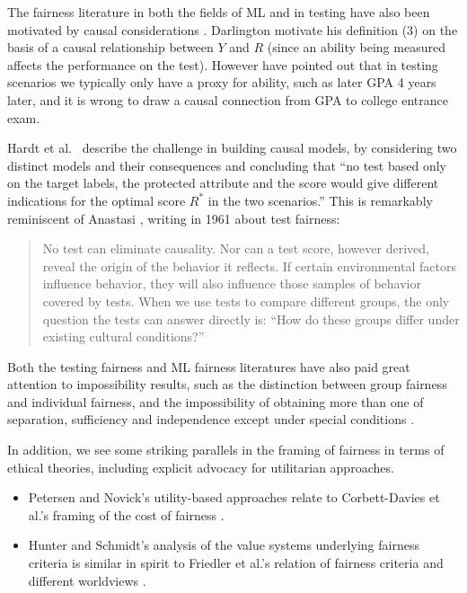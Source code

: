 \documentclass[sigconf,letterpaper,9pt]{acmart}
\begin{document}
The fairness literature in both the fields of ML and in testing have also been motivated by causal
considerations \cite{kusner2017counterfactual, Hardtetal2016equality}. Darlington 
\cite{darlington1971another} motivate his definition (3) on the basis
of a causal relationship between $Y$ and $R$ (since
an ability being measured affects the performance on the test).
However \cite{hunter1976critical}
have pointed out that in testing scenarios we typically only have a proxy
for ability, such as later GPA 4 years later, and it is wrong to draw
a causal connection from GPA to college entrance exam.

Hardt et al.\ \cite{Hardtetal2016equality} describe the challenge in 
building causal models, by considering two distinct models and their consequences and concluding 
that ``no test based only on the target labels, the protected attribute and the score would give
different indications for the optimal score $R^{*}$ in the two scenarios.''
This is remarkably reminiscent of Anastasi \cite{anastasi1961psychological}, writing in 1961 about test fairness:
\begin{quote}
\fontsize{8.5}{10}\selectfont
No test can eliminate
causality. Nor can a test score, however derived, reveal the
origin of the behavior it reflects. If certain environmental
factors influence behavior, they will also influence those
samples of behavior covered by tests. When we use tests to
compare different groups, the only question the tests can
answer directly is: ``How do these groups differ under existing
cultural conditions?''
\end{quote}

Both the testing fairness and ML fairness literatures have also paid
great attention to impossibility results, such as the 
distinction between group fairness and individual fairness, and
the impossibility of obtaining more than one of separation,
sufficiency and independence except under special conditions
\cite{thorndike1971concepts,darlington1971another,petersen1976evaluation,
barocas2018fairness, chouldechova2017fair,kleinberg2016inherent}.

In addition, we see some striking parallels in the framing of fairness in terms 
of ethical theories, including explicit advocacy for utilitarian approaches.  
\begin{itemize}
\item Petersen and Novick's utility-based approaches relate to Corbett-Davies et al.'s 
framing of the cost of fairness \cite{CorbettDavies2017EtAl}.
\item Hunter and Schmidt's analysis of the value systems underlying fairness criteria 
is similar in spirit to Friedler et al.'s relation of fairness criteria and different worldviews
\cite{friedler2016possibility}.
\end{itemize}
\end{document}
